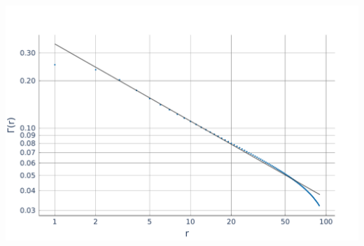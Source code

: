 \documentclass[aspectratio=169]{beamer}
\begin{document}
\begin{frame}
\begin{onlyenv}
\begin{center}
      \includegraphics[scale=0.22]{../img/Correlations-SF2.pdf}
    \end{center}
  \end{onlyenv}
\end{frame}
\end{document}
